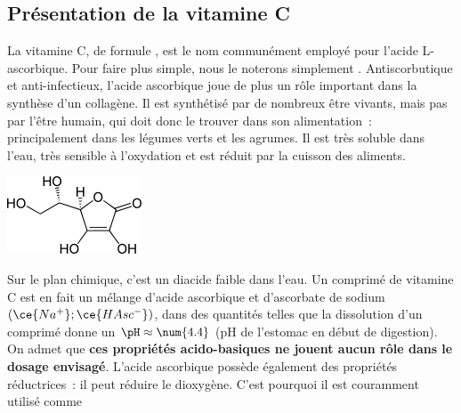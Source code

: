 \documentclass[../main/main.tex]{subfiles}
\begin{document}
{	\subsection{Présentation de la vitamine C}
	\noindent
	\begin{minipage}[t]{.70\linewidth}
		La vitamine C, de formule , est le nom communément employé pour
		l'acide L-ascorbique. Pour faire plus simple, nous le noterons simplement
		. Antiscorbutique et anti-infectieux, l'acide ascorbique joue de
		plus un rôle important dans la synthèse d'un collagène. Il est synthétisé
		par de nombreux être vivants, mais pas par l'être humain, qui doit donc le
		trouver dans son alimentation~: principalement dans les légumes verts et les
		agrumes. Il est très soluble dans l'eau, très sensible à l'oxydation et est
		réduit par la cuisson des aliments.
	\end{minipage}
	\hfill
	\begin{minipage}[t]{.30\linewidth}
		\vspace{0pt}
		\begin{center}
			\includegraphics[width=\linewidth]{h2asc.png}
		\end{center}
	\end{minipage}
	\bigbreak
	Sur le plan chimique, c'est un diacide faible dans l'eau. Un comprimé de
	vitamine C est en fait un mélange d'acide ascorbique  et d'ascorbate
	de sodium $(\ce{Na^+};\ce{HAsc^-})$, dans des quantités telles que la
	dissolution d'un comprimé donne un $\pH \approx \num{4.4}$ (pH de l'estomac en
	début de digestion). On admet que \textbf{ces propriétés acido-basiques ne
		jouent aucun rôle dans le dosage envisagé}.
	\bigbreak
	L'acide ascorbique possède également des propriétés réductrices~: il peut
	réduire le dioxygène. C'est pourquoi il est couramment utilisé comme
}
\end{document}

